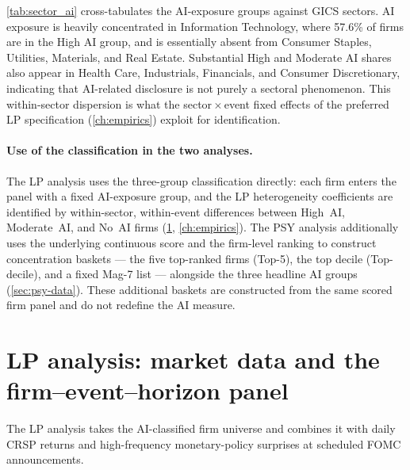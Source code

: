 \cref{tab:sector_ai} cross-tabulates the AI-exposure groups against GICS sectors. AI exposure is heavily concentrated in Information Technology, where 57.6\% of firms are in the High AI group, and is essentially absent from Consumer Staples, Utilities, Materials, and Real Estate. Substantial High and Moderate AI shares also appear in Health Care, Industrials, Financials, and Consumer Discretionary, indicating that AI-related disclosure is not purely a sectoral phenomenon. This within-sector dispersion is what the sector\,$\times$\,event fixed effects of the preferred LP specification (\cref{ch:empirics}) exploit for identification.

\begin{table}[!htbp]
\centering
\caption{AI exposure by GICS sector.}
\label{tab:sector_ai}

\end{table}

\paragraph{Use of the classification in the two analyses.} The LP analysis uses the three-group classification directly: each firm enters the panel with a fixed AI-exposure group, and the LP heterogeneity coefficients are identified by within-sector, within-event differences between High~AI, Moderate~AI, and No~AI firms (\cref{sec:lp-data}, \cref{ch:empirics}). The PSY analysis additionally uses the underlying continuous score and the firm-level ranking to construct concentration baskets --- the five top-ranked firms (Top-5), the top decile (Top-decile), and a fixed Mag-7 list --- alongside the three headline AI groups (\cref{sec:psy-data}). These additional baskets are constructed from the same scored firm panel and do not redefine the AI measure.

\section{LP analysis: market data and the firm--event--horizon panel}
\label{sec:lp-data}

The LP analysis takes the AI-classified firm universe and combines it with daily CRSP returns and high-frequency monetary-policy surprises at scheduled FOMC announcements.

